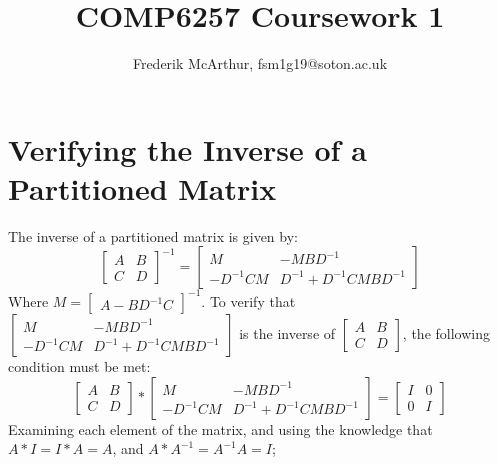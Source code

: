 \documentclass[a4paper, 11pt]{article}
\title{COMP6257 Coursework 1}
\author{Frederik McArthur, fsm1g19@soton.ac.uk}
\begin{document}
\maketitle
\tableofcontents


\section{Verifying the Inverse of a Partitioned Matrix}
\label{section:partitionedmatrix}
The inverse of a partitioned matrix is given by:
$$
\begin{bmatrix}
    A & B \\
    C & D
\end{bmatrix}^{-1}
= \begin{bmatrix}
    M & -MBD^{-1} \\
    -D^{-1}CM & D^{-1} + D^{-1}CMBD^{-1}
\end{bmatrix}
    $$
Where $M = \begin{bmatrix}
    A - BD^{-1}C
\end{bmatrix}^{-1}$. To verify that $\begin{bmatrix}
    M & -MBD^{-1} \\
    -D^{-1}CM & D^{-1} + D^{-1}CMBD^{-1}
\end{bmatrix}$ is the inverse of $\begin{bmatrix}
    A & B \\
    C & D
\end{bmatrix}$, the following condition must be met:
$$
\begin{bmatrix}
    A & B \\
    C & D
\end{bmatrix} * 
\begin{bmatrix}
    M & -MBD^{-1} \\
    -D^{-1}CM & D^{-1} + D^{-1}CMBD^{-1}
\end{bmatrix}
= \begin{bmatrix}
    I & 0 \\
    0 & I
\end{bmatrix}$$
Examining each element of the matrix, and using the knowledge that $A*I = I*A = A$, and $A*A^{-1} = A^{-1}A = I$;
\end{document}
